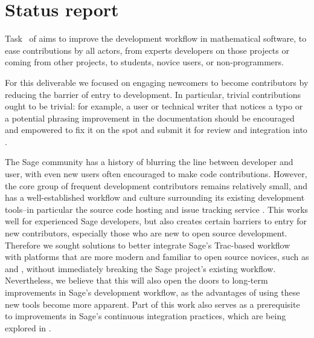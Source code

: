 \hypertarget{status-report}{%
\section{Status report}\label{status-report}}



Task~ of
 aims to improve the development workflow in
mathematical software, to ease contributions by all actors, from experts
developers on those projects or coming from other projects, to students, novice
users, or non-programmers.

For this deliverable we focused on engaging newcomers to become contributors by
reducing the barrier of entry to \Sage development. In particular, trivial
contributions ought to be trivial: for example, a user or technical writer that
notices a typo or a potential phrasing improvement in the documentation should
be encouraged and empowered to fix it on the spot and submit it for review and
integration into \Sage.

The Sage community has a history of blurring the line between developer and
user, with even new users often encouraged to make code contributions.
However, the core group of frequent development contributors remains relatively
small, and has a well-established workflow and culture surrounding its existing
development tools--in particular the source code hosting and issue tracking
service \Trac.  This works well for experienced Sage developers, but also
creates certain barriers to entry for new contributors, especially those who
are new to open source development.  Therefore we sought solutions to better
integrate Sage's Trac-based workflow with platforms that are more modern and
familiar to open source novices, such as \GitHub and \GitLab, without
immediately breaking the Sage project's existing workflow.
%
%
Nevertheless, we believe that this will also open the doors to long-term
improvements in Sage's development workflow, as the advantages of using these
new tools become more apparent.  Part of this work also serves as a
prerequisite to improvements in Sage's continuous integration practices, which
are being explored in
.

